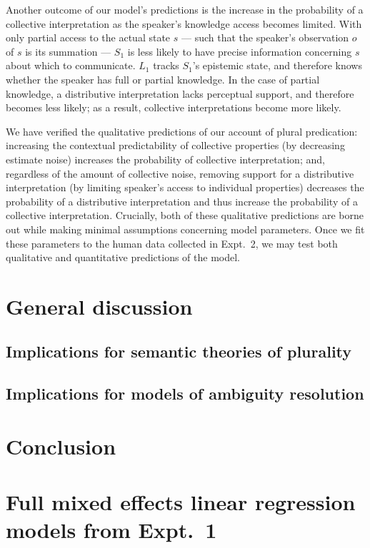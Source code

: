 \documentclass[linguex]{sp}
\begin{document}
Another outcome of our model's predictions is the increase in the probability of a collective interpretation as the speaker's knowledge access becomes limited. With only partial access to the actual state $s$ --- such that the speaker's observation $o$ of $s$ is its summation ---  $S_{1}$ is less likely to have precise information concerning $s$ about which to communicate. $L_{1}$ tracks  $S_{1}$'s epistemic state, and therefore knows whether the speaker has full or partial knowledge. In the case of partial knowledge, a distributive interpretation lacks perceptual support, and therefore becomes less likely; as a result, collective interpretations become more likely.

We have verified the qualitative predictions of our account of plural predication: increasing the contextual predictability of collective properties (by decreasing estimate noise) increases the probability of collective interpretation; and, regardless of the amount of collective noise, removing support for a distributive interpretation (by limiting speaker's access to individual properties) decreases the probability of a distributive interpretation and thus increase the probability of a collective interpretation. Crucially, both of these qualitative predictions are borne out while making minimal assumptions concerning model parameters. Once we fit these parameters to the human data collected in Expt.~2, we may test both qualitative and quantitative predictions of the model.



\section{General discussion}


\subsection{Implications for semantic theories of plurality}


\subsection{Implications for models of ambiguity resolution}


\section{Conclusion}


\appendix
\section{Full mixed effects linear regression models from Expt.~1}\label{expt1results}
\end{document}
